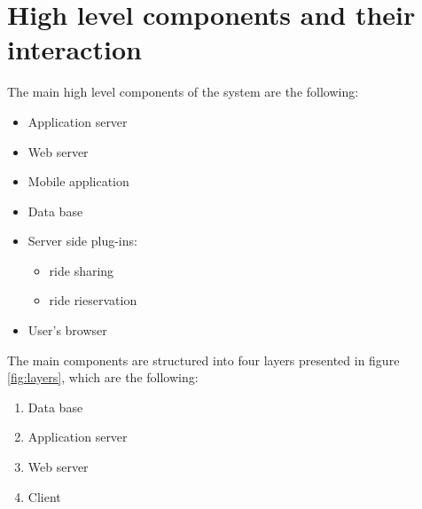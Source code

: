\section{High level components and their interaction}
\label{sec:high-level}

The main high level components of the system are the following:
\begin{itemize}
	\item Application server
	\item Web server
	\item Mobile application
	\item Data base
	\item Server side plug-ins:
		\begin{itemize}
		\item ride sharing
		\item ride rieservation
		\end{itemize}
	\item User's browser
\end{itemize}

The main components are structured into four layers presented in figure \ref{fig:layers}, which are the following:
\begin {enumerate}
	\item Data base
	\item Application server
	\item Web server
	\item Client
\end{enumerate}

